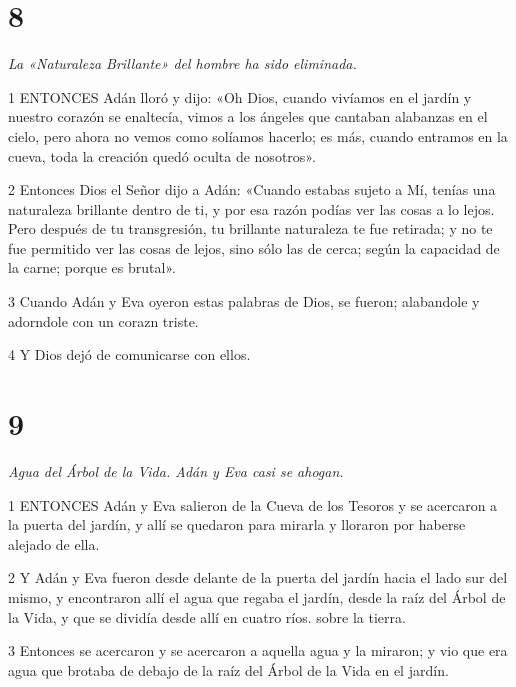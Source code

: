 \chapter{8}

\par \textit{La «Naturaleza Brillante» del hombre ha sido eliminada.}

\par 1 ENTONCES Adán lloró y dijo: «Oh Dios, cuando vivíamos en el jardín y nuestro corazón se enaltecía, vimos a los ángeles que cantaban alabanzas en el cielo, pero ahora no vemos como solíamos hacerlo; es más, cuando entramos en la cueva, toda la creación quedó oculta de nosotros».

\par 2 Entonces Dios el Señor dijo a Adán: «Cuando estabas sujeto a Mí, tenías una naturaleza brillante dentro de ti, y por esa razón podías ver las cosas a lo lejos. Pero después de tu transgresión, tu brillante naturaleza te fue retirada; y no te fue permitido ver las cosas de lejos, sino sólo las de cerca; según la capacidad de la carne; porque es brutal».

\par 3 Cuando Adán y Eva oyeron estas palabras de Dios, se fueron; alabandole y adorndole con un corazn triste.

\par 4 Y Dios dejó de comunicarse con ellos.

\chapter{9}

\par \textit{Agua del Árbol de la Vida. Adán y Eva casi se ahogan.}

\par 1 ENTONCES Adán y Eva salieron de la Cueva de los Tesoros y se acercaron a la puerta del jardín, y allí se quedaron para mirarla y lloraron por haberse alejado de ella.

\par 2 Y Adán y Eva fueron desde delante de la puerta del jardín hacia el lado sur del mismo, y encontraron allí el agua que regaba el jardín, desde la raíz del Árbol de la Vida, y que se dividía desde allí en cuatro ríos. sobre la tierra.

\par 3 Entonces se acercaron y se acercaron a aquella agua y la miraron; y vio que era agua que brotaba de debajo de la raíz del Árbol de la Vida en el jardín.

